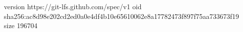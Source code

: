 version https://git-lfs.github.com/spec/v1
oid sha256:ac8d98e202cd2ed0a0e4df4b10e65610062e8a17782473f897f75aa733673f19
size 196704
